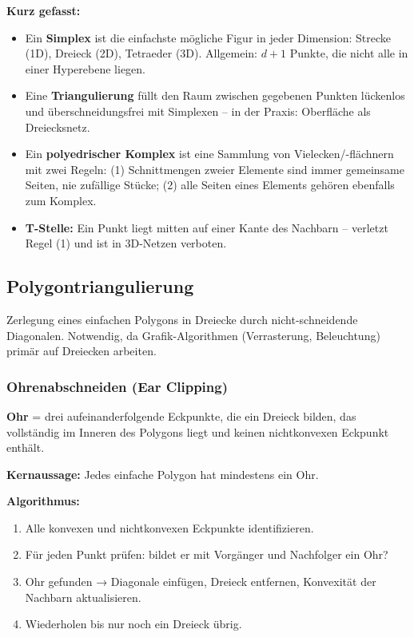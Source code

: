 \documentclass[12pt, a4paper]{article}
\begin{document}
\textbf{Kurz gefasst:}
\begin{itemize}
  \item Ein \textbf{Simplex} ist die einfachste mögliche Figur in jeder Dimension: Strecke (1D), Dreieck (2D), Tetraeder (3D). Allgemein: $d+1$ Punkte, die nicht alle in einer Hyperebene liegen.
  \item Eine \textbf{Triangulierung} füllt den Raum zwischen gegebenen Punkten lückenlos und überschneidungsfrei mit Simplexen -- in der Praxis: Oberfläche als Dreiecksnetz.
  \item Ein \textbf{polyedrischer Komplex} ist eine Sammlung von Vielecken/-flächnern mit zwei Regeln: (1) Schnittmengen zweier Elemente sind immer gemeinsame Seiten, nie zufällige Stücke; (2) alle Seiten eines Elements gehören ebenfalls zum Komplex.
  \item \textbf{T-Stelle:} Ein Punkt liegt mitten auf einer Kante des Nachbarn -- verletzt Regel (1) und ist in 3D-Netzen verboten.
\end{itemize}

\subsection{Polygontriangulierung}

Zerlegung eines einfachen Polygons in Dreiecke durch nicht-schneidende Diagonalen. Notwendig, da Grafik-Algorithmen (Verrasterung, Beleuchtung) primär auf Dreiecken arbeiten.

\subsubsection*{Ohrenabschneiden (Ear Clipping)}

\textbf{Ohr} = drei aufeinanderfolgende Eckpunkte, die ein Dreieck bilden, das vollständig im Inneren des Polygons liegt und keinen nichtkonvexen Eckpunkt enthält.

\textbf{Kernaussage:} Jedes einfache Polygon hat mindestens ein Ohr.

\textbf{Algorithmus:}
\begin{enumerate}
  \item Alle konvexen und nichtkonvexen Eckpunkte identifizieren.
  \item Für jeden Punkt prüfen: bildet er mit Vorgänger und Nachfolger ein Ohr?
  \item Ohr gefunden → Diagonale einfügen, Dreieck entfernen, Konvexität der Nachbarn aktualisieren.
  \item Wiederholen bis nur noch ein Dreieck übrig.
\end{enumerate}
\end{document}
